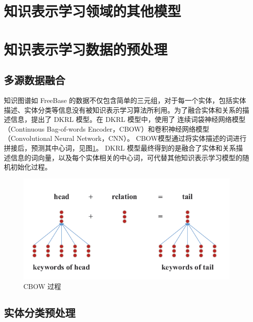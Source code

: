 \documentclass{llncs}
\begin{document}
\section{知识表示学习领域的其他模型}

\section{知识表示学习数据的预处理}

\subsection{多源数据融合}

知识图谱如 FreeBase 的数据不仅包含简单的三元组，对于每一个实体，包括实体描述、实体分类等信息没有被知识表示学习算法所利用。为了融合实体和关系的描述信息，提出了 DKRL 模型\cite{DBLP:conf/aaai/XieLJLS16}。在 DKRL 模型中，使用了 连续词袋神经网络模型（Continuous Bag-of-words Encoder，CBOW）\cite{DBLP:journals/corr/abs-1301-3781}和卷积神经网络模型（Convolutional Neural Network，CNN）\cite{DBLP:conf/icml/CollobertW08}。 CBOW模型通过将实体描述的词进行拼接后，预测其中心词，见图\ref{fg:CBOW}。 DKRL 模型最终得到的是融合了实体和关系描述信息的词向量，以及每个实体相关的中心词，可代替其他知识表示学习模型的随机初始化过程。

\begin{figure}
	\centering
	\includegraphics[width=0.8\columnwidth]{figures/CBOW.png}
	\caption{ CBOW 过程}
	\label{fg:CBOW}
\end{figure}

\subsection{实体分类预处理}
\end{document}
